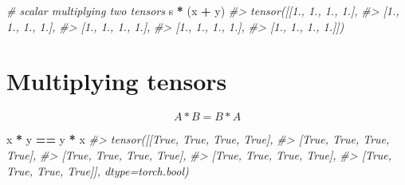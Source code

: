 \documentclass[]{book}
\newenvironment{Shaded}{\begin{snugshade}}{\end{snugshade}}
\newcommand{\CommentTok}[1]{\textcolor[rgb]{0.56,0.35,0.01}{\textit{#1}}}
\newcommand{\DataTypeTok}[1]{\textcolor[rgb]{0.13,0.29,0.53}{#1}}
\newcommand{\DecValTok}[1]{\textcolor[rgb]{0.00,0.00,0.81}{#1}}
\newcommand{\KeywordTok}[1]{\textcolor[rgb]{0.13,0.29,0.53}{\textbf{#1}}}
\newcommand{\NormalTok}[1]{#1}
\newcommand{\OperatorTok}[1]{\textcolor[rgb]{0.81,0.36,0.00}{\textbf{#1}}}
\newcommand{\StringTok}[1]{\textcolor[rgb]{0.31,0.60,0.02}{#1}}
\begin{document}
\begin{Shaded}
\begin{Highlighting}[]
\CommentTok{# scalar multiplying two tensors}
\NormalTok{s }\OperatorTok{*}\StringTok{ }\NormalTok{(x }\OperatorTok{+}\StringTok{ }\NormalTok{y)}
\CommentTok{#> tensor([[1., 1., 1., 1.],}
\CommentTok{#>         [1., 1., 1., 1.],}
\CommentTok{#>         [1., 1., 1., 1.],}
\CommentTok{#>         [1., 1., 1., 1.],}
\CommentTok{#>         [1., 1., 1., 1.]])}
\end{Highlighting}
\end{Shaded}

\hypertarget{multiplying-tensors}{%
\section{Multiplying tensors}\label{multiplying-tensors}}

\[A * B = B * A\]

\begin{Shaded}
\end{Shaded}

\begin{Shaded}
\begin{Highlighting}[]
\NormalTok{x }\OperatorTok{*}\StringTok{ }\NormalTok{y }\OperatorTok{==}\StringTok{ }\NormalTok{y }\OperatorTok{*}\StringTok{ }\NormalTok{x}
\CommentTok{#> tensor([[True, True, True, True],}
\CommentTok{#>         [True, True, True, True],}
\CommentTok{#>         [True, True, True, True],}
\CommentTok{#>         [True, True, True, True],}
\CommentTok{#>         [True, True, True, True]], dtype=torch.bool)}
\end{Highlighting}
\end{Shaded}
\end{document}
